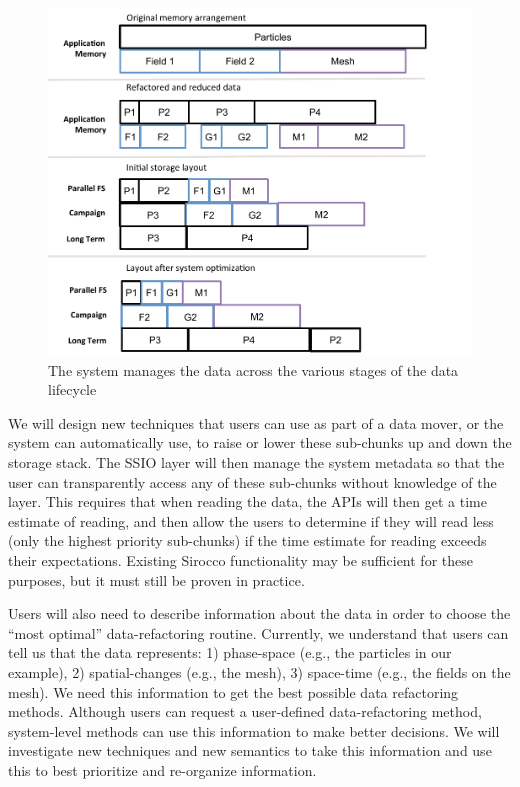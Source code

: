 \begin{figure}
        \begin{centering} 
	\includegraphics[scale=0.7]{graphics/SSIO-bucket.pdf}
        \caption{The system manages the data across the various stages of the data lifecycle}
        \label{fig:ssio-bucket}
        \end{centering}
\end{figure}


We will design new techniques that users can use as part of a data mover, or
the system can automatically use, to raise or lower these sub-chunks up and
down the storage stack. The SSIO layer will then manage the system metadata so
that the user can transparently access any of these sub-chunks without
knowledge of the layer. This requires that when reading the data, the APIs will
then get a time estimate of reading, and then allow the users to determine if
they will read less (only the highest priority sub-chunks) if the time estimate
for reading exceeds their expectations. Existing Sirocco functionality may be
sufficient for these purposes, but it must still be proven in practice.
%

Users will also need to describe information about the data in order to choose
the ``most optimal'' data-refactoring routine. Currently, we understand that
users can tell us that the data represents: 1) phase-space (e.g., the particles
in our example), 2) spatial-changes (e.g., the mesh), 3) space-time (e.g.,
the fields on the mesh). We need this information to get the best possible data
refactoring methods. Although users can request a user-defined data-refactoring
method, system-level methods can use this information to make better decisions.
We will investigate new techniques and new semantics to take this information
and use this to best prioritize and re-organize information.

